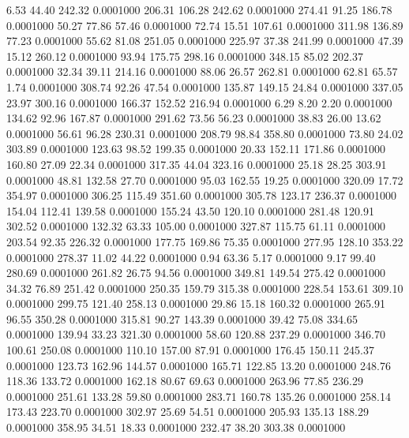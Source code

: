   6.53   44.40  242.32   0.0001000
 206.31  106.28  242.62   0.0001000
 274.41   91.25  186.78   0.0001000
  50.27   77.86   57.46   0.0001000
  72.74   15.51  107.61   0.0001000
 311.98  136.89   77.23   0.0001000
  55.62   81.08  251.05   0.0001000
 225.97   37.38  241.99   0.0001000
  47.39   15.12  260.12   0.0001000
  93.94  175.75  298.16   0.0001000
 348.15   85.02  202.37   0.0001000
  32.34   39.11  214.16   0.0001000
  88.06   26.57  262.81   0.0001000
  62.81   65.57    1.74   0.0001000
 308.74   92.26   47.54   0.0001000
 135.87  149.15   24.84   0.0001000
 337.05   23.97  300.16   0.0001000
 166.37  152.52  216.94   0.0001000
   6.29    8.20    2.20   0.0001000
 134.62   92.96  167.87   0.0001000
 291.62   73.56   56.23   0.0001000
  38.83   26.00   13.62   0.0001000
  56.61   96.28  230.31   0.0001000
 208.79   98.84  358.80   0.0001000
  73.80   24.02  303.89   0.0001000
 123.63   98.52  199.35   0.0001000
  20.33  152.11  171.86   0.0001000
 160.80   27.09   22.34   0.0001000
 317.35   44.04  323.16   0.0001000
  25.18   28.25  303.91   0.0001000
  48.81  132.58   27.70   0.0001000
  95.03  162.55   19.25   0.0001000
 320.09   17.72  354.97   0.0001000
 306.25  115.49  351.60   0.0001000
 305.78  123.17  236.37   0.0001000
 154.04  112.41  139.58   0.0001000
 155.24   43.50  120.10   0.0001000
 281.48  120.91  302.52   0.0001000
 132.32   63.33  105.00   0.0001000
 327.87  115.75   61.11   0.0001000
 203.54   92.35  226.32   0.0001000
 177.75  169.86   75.35   0.0001000
 277.95  128.10  353.22   0.0001000
 278.37   11.02   44.22   0.0001000
   0.94   63.36    5.17   0.0001000
   9.17   99.40  280.69   0.0001000
 261.82   26.75   94.56   0.0001000
 349.81  149.54  275.42   0.0001000
  34.32   76.89  251.42   0.0001000
 250.35  159.79  315.38   0.0001000
 228.54  153.61  309.10   0.0001000
 299.75  121.40  258.13   0.0001000
  29.86   15.18  160.32   0.0001000
 265.91   96.55  350.28   0.0001000
 315.81   90.27  143.39   0.0001000
  39.42   75.08  334.65   0.0001000
 139.94   33.23  321.30   0.0001000
  58.60  120.88  237.29   0.0001000
 346.70  100.61  250.08   0.0001000
 110.10  157.00   87.91   0.0001000
 176.45  150.11  245.37   0.0001000
 123.73  162.96  144.57   0.0001000
 165.71  122.85   13.20   0.0001000
 248.76  118.36  133.72   0.0001000
 162.18   80.67   69.63   0.0001000
 263.96   77.85  236.29   0.0001000
 251.61  133.28   59.80   0.0001000
 283.71  160.78  135.26   0.0001000
 258.14  173.43  223.70   0.0001000
 302.97   25.69   54.51   0.0001000
 205.93  135.13  188.29   0.0001000
 358.95   34.51   18.33   0.0001000
 232.47   38.20  303.38   0.0001000
